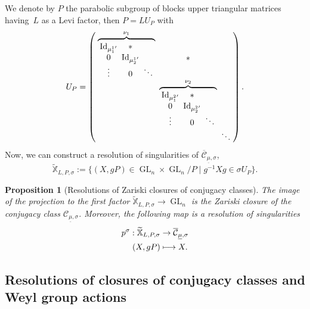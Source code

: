 \documentclass[11pt]{article}
\newcommand{\Subsection}{\subsection}
\newcommand\mto{\mathchoice{\longmapsto}{\mapsto}{\mapsto}{\mapsto}}
\theoremstyle{definition}
\theoremstyle{plain}
\newtheorem{proposition}[definition]{Proposition}
\DeclareMathOperator{\Id}{Id}
\DeclareMathOperator{\GL}{GL}
\newcommand{\map}[5]{%
\begin{split}
#1: #2 & \to #3 \\
#4 & \mto #5
\end{split}%
}
\newcommand{\inv}{^{-1}}
\begin{document}
We denote by $P$ the parabolic subgroup of blocks upper triangular matrices having~$L$ as a Levi factor, then $P=L U_P$ with
\[\arraycolsep2.5pt
U_P =\left(
\begin{array}{ccccc}
\overbrace{
\begin{array}{ccccc}
\Id_{{\mu^{1}_1}' } & * & \\
0 & \Id_{{\mu^{1}_2}' } & \\
\vdots & 0 & \ddots
\end{array}
}^{\nu_1} & \text{\Large{*}} & \\
& \overbrace{
\begin{array}{ccccc}
\Id_{{\mu^{2}_1}' } & * & \\
0 & \Id_{{\mu^{2}_2}' } & \\
\vdots & 0 & \ddots
\end{array}
}^{\nu_2} & \\
& & \ddots
\end{array}
\right).
\]
Now, we can construct a resolution of singularities of $\overline{\mathcal{C}}_{\underline{\mu},\sigma}$,
\[
\mathbb{\widetilde{X}}_{L,P,\sigma} :=\lbrace (X, g P) \in \GL_n \times \GL_n / P \mid g\inv X g \in \sigma U_P\rbrace.
\]
\begin{proposition}[Resolutions of Zariski closures of conjugacy classes]\label{prop_resol_closure}
The image of the projection to the first factor $\mathbb{\widetilde{X}}_{L,P,\sigma}\to \GL_n $ is the Zariski closure of the conjugacy class $\mathcal{C}_{\underline{\mu},\sigma}$. Moreover, the following map is a resolution of singularities
\[
\map{p^{\sigma}}{\mathbb{\widetilde{X}}_{L,P,\sigma}}{\overline{\mathcal{C}}_{\underline{\mu},\sigma}}{(X,g P)}{X.}
\]
\end{proposition}

\Subsection{Resolutions of closures of conjugacy classes and Weyl group actions}
\label{sect_resol_cc}
\end{document}
